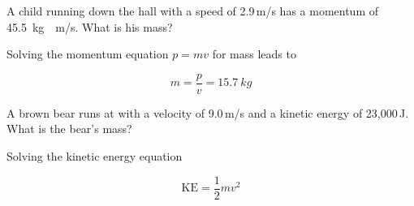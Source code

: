 \documentclass[answers]{exam}
\begin{document}
\begin{questions}
\question %
A child running down the hall with a speed of 2.9\,m/s has a momentum of \SI{45.5}{kg\cdot m/s}. What is his mass?

\begin{solution}
Solving the momentum equation $p = mv$ for mass leads to 

\begin{equation*}
    m = \frac{p}{v} = \boxed{\SI{15.7}{kg}}
\end{equation*}
\end{solution}













\question %
A brown bear runs at with a velocity of 9.0\,m/s and a kinetic energy of 23,000\,J. What is the bear’s mass?

\begin{solution}
Solving the kinetic energy equation

\begin{equation*}
    \mathrm{KE} = \frac{1}{2} mv^2
\end{equation*}


\end{solution}
\end{questions}
\end{document}
